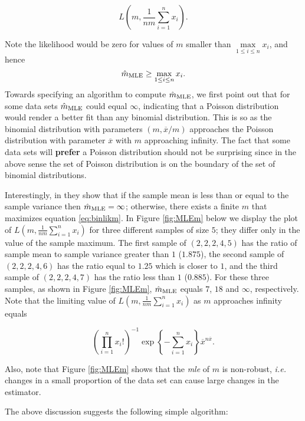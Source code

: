 \documentclass[]{book}
\theoremstyle{definition}
\theoremstyle{definition}
\theoremstyle{definition}
\theoremstyle{remark}
\begin{document}
\begin{equation}
L\left(m,\frac{1}{nm}\sum_{i=1}^n x_i\right).
\label{eq:binlikm}
\end{equation}

Note the likelihood would be zero for values of \(m\) smaller than
\(\max\limits_{1\leq i \leq n}x_i\), and hence \[
\hat{m}_{\rm MLE}\geq \max_{1\leq i \leq n}x_i.
\] Towards specifying an algorithm to compute \(\hat{m}_{\rm MLE}\), we
first point out that for some data sets \(\hat{m}_{\rm MLE}\) could
equal \(\infty\), indicating that a Poisson distribution would render a
better fit than any binomial distribution. This is so as the binomial
distribution with parameters \((m,\overline{x}/m)\) approaches the
Poisson distribution with parameter \(\overline{x}\) with \(m\)
approaching infinity. The fact that some data sets will \textbf{prefer}
a Poisson distribution should not be surprising since in the above sense
the set of Poisson distribution is on the boundary of the set of
binomial distributions.

Interestingly, in \citep{olkin1981} they show that if the sample mean is
less than or equal to the sample variance then
\(\hat{m}_{\rm MLE}=\infty\); otherwise, there exists a finite \(m\)
that maximizes equation \eqref{eq:binlikm}. In Figure \ref{fig:MLEm} below
we display the plot of \(L\left(m,\frac{1}{nm}\sum_{i=1}^n x_i\right)\)
for three different samples of size \(5\); they differ only in the value
of the sample maximum. The first sample of \((2,2,2,4,5)\) has the ratio
of sample mean to sample variance greater than \(1\) (\(1.875\)), the
second sample of \((2,2,2,4,6)\) has the ratio equal to \(1.25\) which
is closer to \(1\), and the third sample of \((2,2,2,4,7)\) has the
ratio less than \(1\) (\(0.885\)). For these three samples, as shown in
Figure \ref{fig:MLEm}, \(\hat{m}_{\rm MLE}\) equals \(7\), \(18\) and
\(\infty\), respectively. Note that the limiting value of
\(L\left(m,\frac{1}{nm}\sum_{i=1}^n x_i\right)\) as \(m\) approaches
infinity equals

\begin{equation}
\left(\prod_{i=1}^n x_i! \right)^{-1} \exp\left\{-\sum_{i=1}^n x_i\right\} \overline{x}^{n\overline{x}}. 
\label{eq:Poilik}
\end{equation}

Also, note that Figure \ref{fig:MLEm} shows that the \emph{mle} of \(m\)
is non-robust, \emph{i.e.} changes in a small proportion of the data set
can cause large changes in the estimator.

The above discussion suggests the following simple algorithm:
\end{document}
